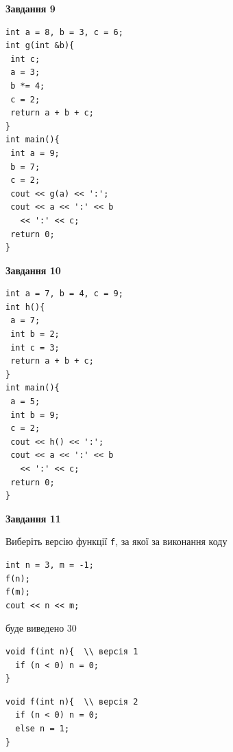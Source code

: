 \documentclass[12pt, ukrainian]{article}
\def\code#1{\Verb!#1!}
\begin{document}
{\begin {large}
\begin{minipage}[t]{11.0cm}
\end{minipage}


\begin{minipage}[t]{7.0cm}

\begin{center}
\textbf{Завдання 9}
\end{center}
\vspace{-8mm}

\begin{verbatim}
int a = 8, b = 3, c = 6;
int g(int &b){
 int c;
 a = 3;
 b *= 4;
 c = 2;
 return a + b + c;
}
int main(){
 int a = 9;
 b = 7;
 c = 2;
 cout << g(a) << ':';
 cout << a << ':' << b 
   << ':' << c;
 return 0;
}
\end{verbatim}



\begin{center}
\textbf{Завдання 10}
\end{center}
\vspace{-8mm}

\begin{verbatim}
int a = 7, b = 4, c = 9;
int h(){
 a = 7;
 int b = 2;
 int c = 3;
 return a + b + c;
}
int main(){
 a = 5;
 int b = 9;
 c = 2;
 cout << h() << ':';
 cout << a << ':' << b 
   << ':' << c;
 return 0;
}
\end{verbatim}

\end{minipage}
\vline \hspace{1mm}
\begin{minipage}[t]{11.0cm}

\begin{center}
\textbf{Завдання 11}
\end{center}
Виберіть версію функції \code{f}, за якої за виконання коду
\begin{verbatim}
int n = 3, m = -1;
f(n);
f(m);
cout << n << m;
\end{verbatim}

буде виведено 30

\begin{verbatim}
void f(int n){  \\ версія 1
  if (n < 0) n = 0;
}
\end{verbatim}

\vspace{-8mm}\begin{verbatim}
void f(int n){  \\ версія 2
  if (n < 0) n = 0;
  else n = 1;
}
\end{verbatim}


\end{minipage}
\end{large}}
\end{document}
